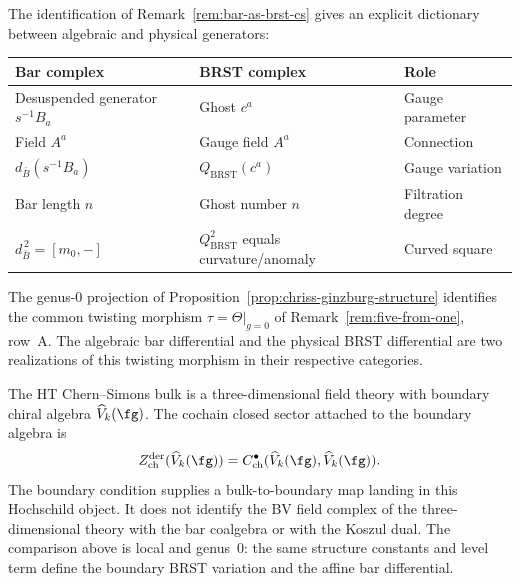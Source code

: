 \begin{remark}
\label{rem:affine-ghost-dictionary}
The identification of Remark~\ref{rem:bar-as-brst-cs} gives an
explicit dictionary between algebraic and physical generators:
\begin{center}
\renewcommand{\arraystretch}{1.3}
\begin{tabular}{lll}
\toprule
\textbf{Bar complex} & \textbf{BRST complex} & \textbf{Role} \\
\midrule
Desuspended generator $s^{-1}B_a$ & Ghost $c^a$ & Gauge parameter \\
Field $A^a$ & Gauge field $A^a$ & Connection \\
$d_{\bar{B}}(s^{-1}B_a)$ & $Q_{\mathrm{BRST}}(c^a)$ & Gauge variation \\
Bar length $n$ & Ghost number $n$ & Filtration degree \\
$d_{\bar{B}}^{\,2}=[m_0,-]$ & $Q_{\mathrm{BRST}}^2$ equals curvature/anomaly & Curved square \\
\bottomrule
\end{tabular}
\end{center}
The genus-$0$ projection of
Proposition~\ref{prop:chriss-ginzburg-structure} identifies the common
twisting morphism
$\tau = \Theta\big|_{g=0}$ of Remark~\ref{rem:five-from-one}, row~A.
The algebraic bar differential and the physical BRST differential are
two realizations of this twisting morphism in their respective
categories.
\end{remark}

\begin{remark}
\label{rem:affine-physical-bulk-cochain-sector}
The HT Chern--Simons bulk is a three-dimensional field theory with
boundary chiral algebra \(\widehat V_k(\fg)\). The cochain closed
sector attached to the boundary algebra is
\[
Z^{\mathrm{der}}_{\mathrm{ch}}(\widehat V_k(\fg))
= C^\bullet_{\mathrm{ch}}(\widehat V_k(\fg),\widehat V_k(\fg)).
\]
The boundary condition supplies a bulk-to-boundary map landing in this
Hochschild object. It does not identify the BV field complex of the
three-dimensional theory with the bar coalgebra or with the Koszul
dual. The comparison above is local and genus~\(0\): the same
structure constants and level term define the boundary BRST variation
and the affine bar differential.
\end{remark}

